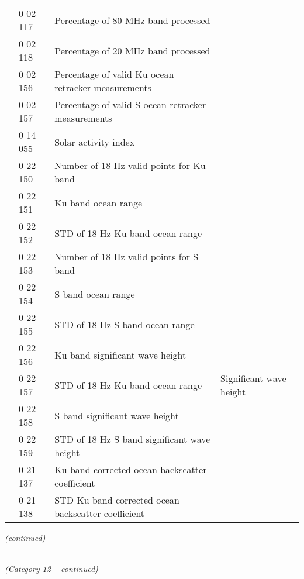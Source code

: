 \begin{longtable}[]{@{}llll@{}}
& 0 02 117 & Percentage of 80 MHz band processed &\tabularnewline
& 0 02 118 & Percentage of 20 MHz band processed &\tabularnewline
& 0 02 156 & Percentage of valid Ku ocean retracker measurements &\tabularnewline
& 0 02 157 & Percentage of valid S ocean retracker measurements &\tabularnewline
& 0 14 055 & Solar activity index &\tabularnewline
& 0 22 150 & Number of 18 Hz valid points for Ku band &\tabularnewline
& 0 22 151 & Ku band ocean range &\tabularnewline
& 0 22 152 & STD of 18 Hz Ku band ocean range &\tabularnewline
& 0 22 153 & Number of 18 Hz valid points for S band &\tabularnewline
& 0 22 154 & S band ocean range &\tabularnewline
& 0 22 155 & STD of 18 Hz S band ocean range &\tabularnewline
& 0 22 156 & Ku band significant wave height &\tabularnewline
& 0 22 157 & STD of 18 Hz Ku band ocean range & Significant wave height\tabularnewline
& 0 22 158 & S band significant wave height &\tabularnewline
& 0 22 159 & STD of 18 Hz S band significant wave height &\tabularnewline
& 0 21 137 & Ku band corrected ocean backscatter coefficient &\tabularnewline
& 0 21 138 & STD Ku band corrected ocean backscatter coefficient &\tabularnewline
\bottomrule
\end{longtable}

\emph{(continued)}

\emph{\\
(Category 12 -- continued)}

